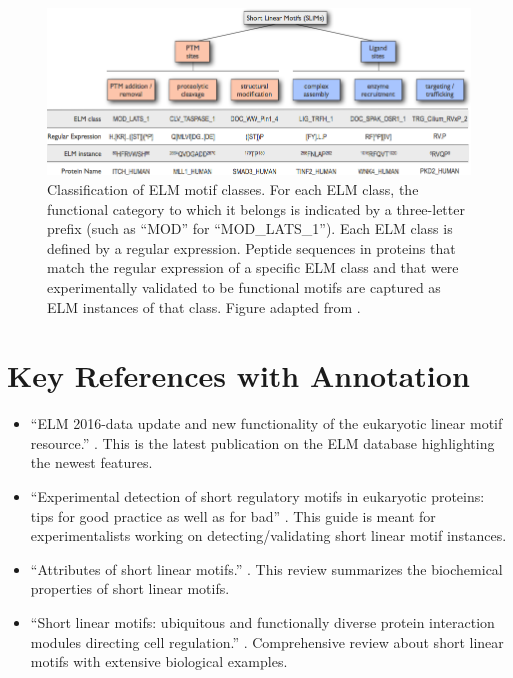 \documentclass[12pt]{article}
\begin{document}
\begin{figure}[h!]
\centering
\includegraphics[width=\textwidth]{Figures/Introduction/functional_classification_of_SLiMs.png}
\caption{
Classification of ELM motif classes.
For each ELM class, the functional category to which it belongs is indicated by
a three-letter prefix (such as ``MOD'' for ``MOD\_LATS\_1'').
Each ELM class is defined by a regular expression. Peptide sequences in
proteins that match the regular expression of a specific ELM class and that
were experimentally validated to be functional motifs are captured as ELM
instances of that class.
Figure adapted from \cite{24773235}.
}
\label{fig:SLiMclasses}
\end{figure}


\section*{Key References with Annotation}
\label{sec:key-references-with-annotation}

\begin{itemize}
\item ``ELM 2016-data update and new functionality of the
	eukaryotic linear motif resource.'' \citep{26615199}.
	This is the latest publication on the ELM database highlighting the
	newest features.

\item ``Experimental detection of short regulatory motifs in eukaryotic proteins: tips
	for good practice as well as for bad'' \citep{26581338}.
	This guide is meant for experimentalists working on detecting/validating short
	linear motif instances.

\item ``Attributes of short linear motifs.'' \citep{21909575}.
	This review summarizes the biochemical properties of short linear
	motifs.

\item ``Short linear motifs: ubiquitous and functionally diverse protein
    interaction modules directing cell regulation.'' \citep{24926813}.
	Comprehensive review about short linear motifs with extensive biological
	examples.

\end{itemize}
\end{document}
